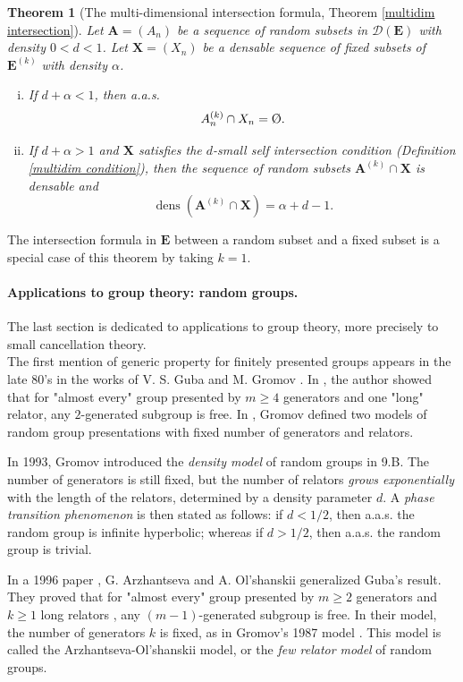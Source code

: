 \documentclass{article}
\DeclareMathOperator{\dens}{dens}
\newcommand{\vide}{\textup{\O}}
\newcommand{\bs}{\boldsymbol}
\newtheorem{thmm}{Theorem}
\theoremstyle{remark}
\begin{document}
\begin{thmm}[The multi-dimensional intersection formula, Theorem \ref{multidim intersection}] Let $\bs A = (A_n)$ be a sequence of random subsets in $\mathcal{D}(\bs E)$ with density $0<d<1$. Let $\bs X = (X_n)$ be a densable sequence of fixed subsets of $\bs E^{(k)}$ with density $\alpha$.
    \begin{enumerate}[(i)]
        \item If $d + \alpha <1$, then a.a.s.
        \[A_n^{(k)}\cap X_n = \vide.\]
        \item If $d + \alpha >1$ and $\bs X$ satisfies the $d$-small self intersection condition (Definition \ref{multidim condition}), then the sequence of random subsets $\bs A^{(k)}\cap \bs X$ is densable and 
        \[\dens (\bs A^{(k)}\cap \bs X) = \alpha + d - 1.\]
    \end{enumerate} 
\end{thmm}

The intersection formula in $\bs E$ between a random subset and a fixed subset is a special case of this theorem by taking $k=1$.

\paragraph{Applications to group theory: random groups.}

The last section is dedicated to applications to group theory, more precisely to small cancellation theory.\\

The first mention of generic property for finitely presented groups appears in the late 80's in the works of V. S. Guba \cite{Guba86} and M. Gromov \cite{Gro87}. In \cite{Guba86}, the author showed that for "almost every" group presented by $m\geq4$ generators and one "long" relator, any $2$-generated subgroup is free. In \cite{Gro87}, Gromov defined two models of random group presentations with fixed number of generators and relators.

In 1993, Gromov introduced the \textit{density model} of random groups in \cite{Gro93} 9.B. The number of generators is still fixed, but the number of relators \textit{grows exponentially} with the length of the relators, determined by a density parameter $d$. A \textit{phase transition phenomenon} is then stated as follows: if $d < 1/2$, then a.a.s. the random group is infinite hyperbolic; whereas if $d>1/2$, then a.a.s. the random group is trivial.

In a 1996 paper \cite{AO96}, G. Arzhantseva and A. Ol’shanskii generalized Guba's result. They proved that for "almost every" group presented by $m\geq2$ generators and $k\geq1$ long relators , any $(m-1)$-generated subgroup is free. In their model, the number of generators $k$ is fixed, as in Gromov's 1987 model \cite{Gro87}. This model is called the Arzhantseva-Ol’shanskii model, or the \textit{few relator model} of random groups.
\end{document}
